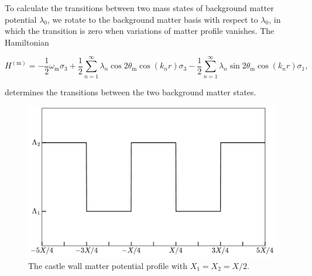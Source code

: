 \documentclass[%
reprint,
 amsmath,amssymb,
 aps,
]{revtex4-1}
\begin{document}
To calculate the transitions between two mass states of background matter potential $\lambda_0$, we rotate to the background matter basis with respect to $\lambda_0$, in which the transition is zero when variations of matter profile vanishes. The Hamiltonian
\begin{widetext}
\begin{equation}
H^{(\mathrm m)} = - \frac{1}{2}\omega_{\mathrm m} \sigma_3  + \frac{1}{2} \sum_{n=1}^{\infty} \lambda_n \cos 2\theta_{\mathrm m} \cos\left( k_n  r \right)  \sigma_3 - \frac{1}{2} \sum_{n=1}^{\infty} \lambda_n \sin 2\theta_{\mathrm m}  \cos\left( k_n r \right) \sigma_1,
\label{castle-wall-decomposed-hamiltonian}
\end{equation}
\end{widetext}
determines the transitions between the two background matter states.


\begin{figure}
    \centering
    \includegraphics[width=\columnwidth]{assets/castlewall-profile}
    \caption{The castle wall matter potential profile with $X_1=X_2=X/2$.}
    \label{fig-castlewall-profile-illustration}
\end{figure}
\end{document}
